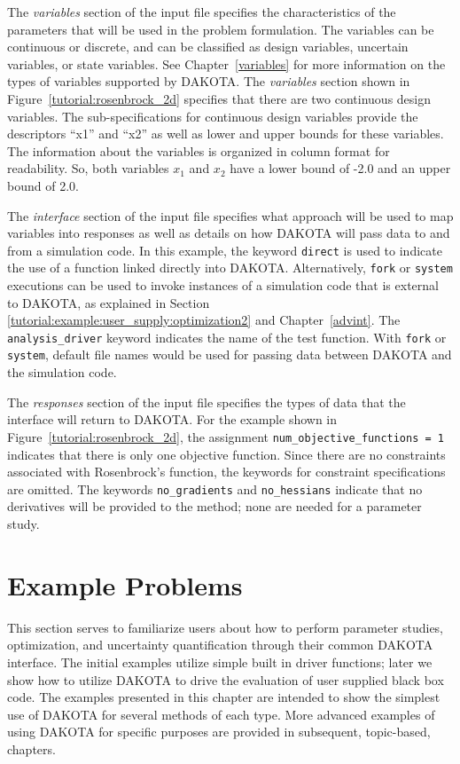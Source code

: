 The \emph{variables} section of the input file specifies the
characteristics of the parameters that will be used in the problem
formulation. The variables can be continuous or discrete, and can be
classified as design variables, uncertain variables, or state
variables. See Chapter~\ref{variables} for more information on the
types of variables supported by DAKOTA.  The \emph{variables} section
shown in Figure~\ref{tutorial:rosenbrock_2d} specifies that there are
two continuous design variables.  The sub-specifications for
continuous design variables
provide the descriptors ``x1'' and ``x2'' as well as lower
and upper bounds for these variables. The information about the
variables is organized in column format for readability. So, both
variables $x_1$ and $x_2$ have a lower bound of -2.0 and an upper
bound of 2.0.

The \emph{interface} section of the input file specifies what approach
will be used to map variables into responses as well as details on how
DAKOTA will pass data to and from a simulation code.
In this example, the keyword \texttt{direct} is used to indicate the
use of a function linked directly into DAKOTA.
Alternatively, \texttt{fork} or \texttt{system} executions can be used
to invoke instances of a simulation code that is external to DAKOTA,
as explained in Section \ref{tutorial:example:user_supply:optimization2} 
and Chapter~\ref{advint}.
The \texttt{analysis\_driver} keyword indicates the name of the test
function.  With \texttt{fork} or \texttt{system}, default file names
would be used for passing data between DAKOTA and the simulation code.

The \emph{responses} section of the input file specifies the types of
data that the interface will return to DAKOTA. For the example shown
in Figure~\ref{tutorial:rosenbrock_2d}, the assignment
\texttt{num\_objective\_functions = 1}
indicates that there is only one objective
function.  Since there are no constraints
associated with Rosenbrock's function, the keywords for
constraint specifications are omitted. The keywords
\texttt{no\_gradients} and \texttt{no\_hessians} indicate that no
derivatives will be provided to the method; none are needed for
a parameter study.

\section{Example Problems}\label{tutorial:example}

This section serves to familiarize users about how to perform parameter 
studies, optimization, and uncertainty quantification through their common
DAKOTA interface.  The initial examples utilize simple built in driver 
functions; later we show how to utilize DAKOTA to drive the evaluation of 
user supplied black box code.  The examples presented in this chapter 
are intended to show the simplest use of DAKOTA for several methods of 
each type.  More advanced examples of using DAKOTA for specific purposes 
are provided in subsequent, topic-based, chapters.

